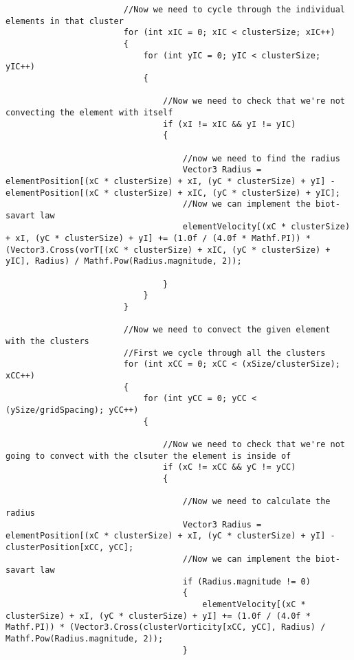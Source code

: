 \begin{mdframed}[linecolor=black, topline=true, bottomline=true,
  leftline=false, rightline=false]
\begin{verbatim}
                        //Now we need to cycle through the individual elements in that cluster
                        for (int xIC = 0; xIC < clusterSize; xIC++)
                        {
                            for (int yIC = 0; yIC < clusterSize; yIC++)
                            {
                                
                                //Now we need to check that we're not convecting the element with itself
                                if (xI != xIC && yI != yIC)
                                {

                                    //now we need to find the radius
                                    Vector3 Radius = elementPosition[(xC * clusterSize) + xI, (yC * clusterSize) + yI] - elementPosition[(xC * clusterSize) + xIC, (yC * clusterSize) + yIC];
                                    //Now we can implement the biot-savart law
                                    elementVelocity[(xC * clusterSize) + xI, (yC * clusterSize) + yI] += (1.0f / (4.0f * Mathf.PI)) * (Vector3.Cross(vorT[(xC * clusterSize) + xIC, (yC * clusterSize) + yIC], Radius) / Mathf.Pow(Radius.magnitude, 2));

                                }
                            }
                        }

                        //Now we need to convect the given element with the clusters
                        //First we cycle through all the clusters
                        for (int xCC = 0; xCC < (xSize/clusterSize); xCC++)
                        {
                            for (int yCC = 0; yCC < (ySize/gridSpacing); yCC++)
                            {

                                //Now we need to check that we're not going to convect with the clsuter the element is inside of
                                if (xC != xCC && yC != yCC)
                                {

                                    //Now we need to calculate the radius
                                    Vector3 Radius = elementPosition[(xC * clusterSize) + xI, (yC * clusterSize) + yI] - clusterPosition[xCC, yCC];
                                    //Now we can implement the biot-savart law
                                    if (Radius.magnitude != 0)
                                    {
                                        elementVelocity[(xC * clusterSize) + xI, (yC * clusterSize) + yI] += (1.0f / (4.0f * Mathf.PI)) * (Vector3.Cross(clusterVorticity[xCC, yCC], Radius) / Mathf.Pow(Radius.magnitude, 2));
                                    }
                                   



\end{verbatim}
\end{mdframed}
